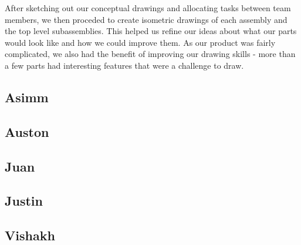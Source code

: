 After sketching out our conceptual drawings and allocating tasks between team members, we then proceded to create isometric drawings of each assembly and the top level subassemblies.
This helped us refine our ideas about what our parts would look like and how we could improve them.
As our product was fairly complicated, we also had the benefit of improving our drawing skills - more than a few parts had interesting features that were a challenge to draw.

\newcommand{\Isometric}[1]{
 \subsection{#1}
  
 \clearpage
}

\Isometric{Asimm}
\Isometric{Auston}
\Isometric{Juan}
\Isometric{Justin}
\Isometric{Vishakh}
